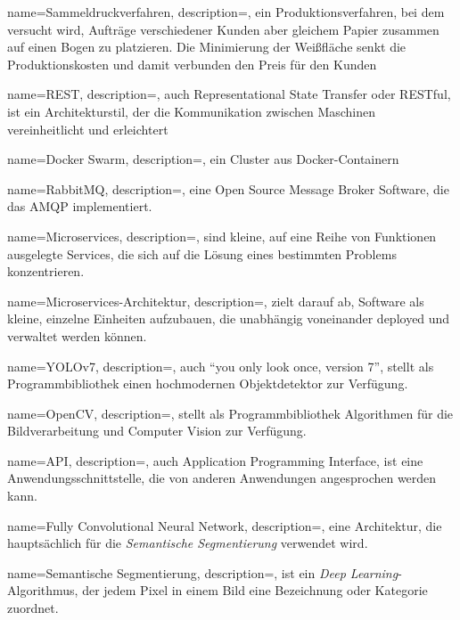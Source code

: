 {
  name={Sammeldruckverfahren},
  description={, ein Produktionsverfahren, bei dem versucht wird, Aufträge verschiedener Kunden aber gleichem Papier zusammen auf einen Bogen zu platzieren. Die Minimierung der Weißfläche senkt die Produktionskosten und damit verbunden den Preis für den Kunden}
}

{
  name={REST},
  description={, auch Representational State Transfer oder RESTful, ist ein Architekturstil, der die Kommunikation zwischen Maschinen vereinheitlicht und erleichtert}
}

{
  name={Docker Swarm},
  description={, ein Cluster aus Docker-Containern}
}

{
  name={RabbitMQ},
  description={, eine Open Source Message Broker Software, die das \acf{AMQP} implementiert. \autocite{rabbitmq}}
}

{
  name={Microservices},
  description={, sind kleine, auf eine Reihe von Funktionen ausgelegte Services, die sich auf die Lösung eines bestimmten Problems konzentrieren. \autocite{aws_microservice}}
}

{
  name={Microservices-Architektur},
  description={, zielt darauf ab, Software als kleine, einzelne Einheiten aufzubauen, die unabhängig voneinander deployed und verwaltet werden können. \autocite{microservices_architekturen}}
}

{
  name={YOLOv7},
  description={, auch \enquote{you only look once, version 7}, stellt als Programmbibliothek einen hochmodernen Objektdetektor zur Verfügung. \autocite{yolov7}}
}

{
  name={OpenCV},
  description={, stellt als Programmbibliothek Algorithmen für die Bildverarbeitung und Computer Vision zur Verfügung. \autocite{opencv}}
}

{
  name={API},
  description={, auch Application Programming Interface, ist eine Anwendungsschnittstelle, die von anderen Anwendungen angesprochen werden kann. \autocite{api}}
}

{
  name={Fully Convolutional Neural Network},
  description={, eine Architektur, die hauptsächlich für die \textit{\gls{Semantische Segmentierung}} verwendet wird. \autocite{fcnn}}
}

{
  name={Semantische Segmentierung},
  description={,  ist ein \textit{\gls{Deep Learning}}-Algorithmus, der jedem Pixel in einem Bild eine Bezeichnung oder Kategorie zuordnet. \autocite{semantische_segmentierung}}
}

